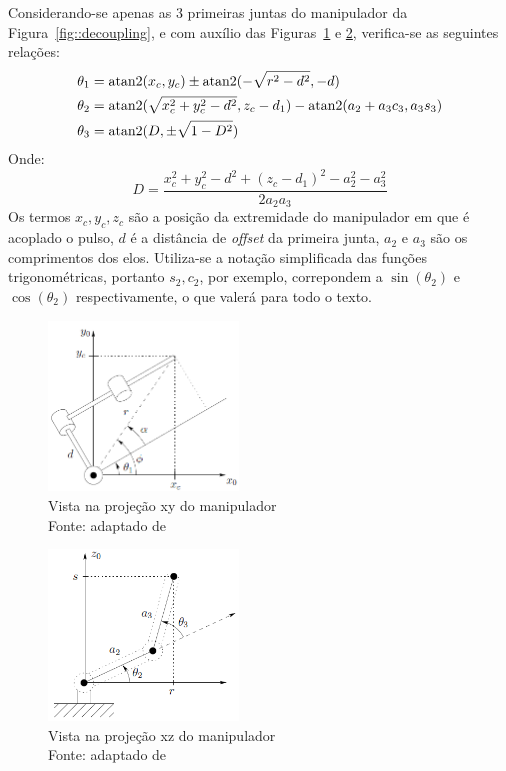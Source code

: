 Considerando-se apenas as 3 primeiras juntas do manipulador da
Figura~\ref{fig::decoupling}, e com auxílio das Figuras~\ref{fig::geom_pos_sup}
e \ref{fig::geom_pos_lat}, verifica-se as seguintes relações:
%
\begin{align}
	\theta_{1} &= \operatorname{atan2}(x_c, y_c) \pm \operatorname{atan2}(-\sqrt{r^2-d^2}, -d)
	\label{eq::theta1}\\
	\theta_{2} &= \operatorname{atan2}(\sqrt{x_c^2+y_c^2-d^2}, z_c-d_1) - \operatorname{atan2}(a_2+a_3
	c_3,a_3 s_3) \label{eq::theta2} \\
	\theta_{3} &= \operatorname{atan2}(D, \pm \sqrt{1-D^2}) \label{eq::theta3}
\end{align}
%
Onde:
\begin{equation*}
		D = \frac{x_c^2+y_c^2-d^2 + (z_c-d_1)^2 - a_2^2 - a_3^2}{2a_2 a_3}
\end{equation*}
%
Os termos $x_c, y_c, z_c$ são a posição da extremidade do manipulador em que
é acoplado o pulso, $d$ é a distância de \textit{offset} da primeira junta,
$a_2$ e $a_3$ são os comprimentos dos elos. Utiliza-se a notação simplificada
das funções trigonométricas, portanto $s_2, c_2$, por exemplo, correpondem a
$\sin(\theta_2)$ e $\cos(\theta_2)$ respectivamente, o que valerá para todo o
texto.


\begin{figure}[h]
	\centering 
 	\includegraphics[width=0.45\textwidth]{figs/geom_pos_sup}
 	\caption[Vista na projeção xy do manipulador]{Vista na projeção xy do manipulador
 	\\ Fonte: adaptado de~\cite{spong2006robot}}
 	\label{fig::geom_pos_sup}
\end{figure}

\begin{figure}[h]
	\centering 
 	\includegraphics[width=0.45\textwidth]{figs/geom_pos_lat}
 	\caption[Vista na projeção xz do manipulador]{Vista na projeção xz do
 	manipulador \\ Fonte: adaptado de~\cite{spong2006robot}}
 	\label{fig::geom_pos_lat}
\end{figure}

